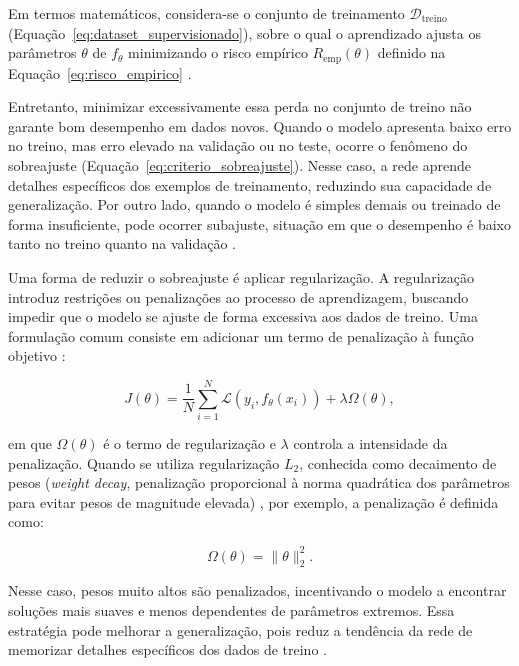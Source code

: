 \documentclass[
    12pt,
    openright,
    oneside,
    a4paper,
    english,
    brazil
]{abntex2}
\begin{document}
Em termos matemáticos, considera-se o conjunto de treinamento \(\mathcal{D}_{\text{treino}}\) (Equação~\eqref{eq:dataset_supervisionado}), sobre o qual o aprendizado ajusta os parâmetros \(\theta\) de \(f_{\theta}\) minimizando o risco empírico \(R_{\text{emp}}(\theta)\) definido na Equação~\eqref{eq:risco_empirico} \cite{deisenroth2020mathematics,goodfellow2016deep}.

Entretanto, minimizar excessivamente essa perda no conjunto de treino não garante bom desempenho em dados novos. Quando o modelo apresenta baixo erro no treino, mas erro elevado na validação ou no teste, ocorre o fenômeno do sobreajuste (Equação~\eqref{eq:criterio_sobreajuste}). Nesse caso, a rede aprende detalhes específicos dos exemplos de treinamento, reduzindo sua capacidade de generalização. Por outro lado, quando o modelo é simples demais ou treinado de forma insuficiente, pode ocorrer subajuste, situação em que o desempenho é baixo tanto no treino quanto na validação \cite{goodfellow2016deep,deisenroth2020mathematics}.

Uma forma de reduzir o sobreajuste é aplicar regularização. A regularização introduz restrições ou penalizações ao processo de aprendizagem, buscando impedir que o modelo se ajuste de forma excessiva aos dados de treino. Uma formulação comum consiste em adicionar um termo de penalização à função objetivo \cite{goodfellow2016deep}:

\begin{equation}
\label{eq:funcao_objetivo_reg}
J(\theta) =
\frac{1}{N}
\sum_{i=1}^{N}
\mathcal{L}(y_i, f_{\theta}(x_i))
+
\lambda \Omega(\theta),
\end{equation}

em que \(\Omega(\theta)\) é o termo de regularização e \(\lambda\) controla a intensidade da penalização. Quando se utiliza regularização \(L_2\), conhecida como decaimento de pesos (\textit{weight decay}, penalização proporcional à norma quadrática dos parâmetros para evitar pesos de magnitude elevada) \cite{goodfellow2016deep}, por exemplo, a penalização é definida como:

\begin{equation}
\label{eq:penalizacao_l2}
\Omega(\theta) = \|\theta\|_2^2.
\end{equation}

Nesse caso, pesos muito altos são penalizados, incentivando o modelo a encontrar soluções mais suaves e menos dependentes de parâmetros extremos. Essa estratégia pode melhorar a generalização, pois reduz a tendência da rede de memorizar detalhes específicos dos dados de treino \cite{goodfellow2016deep}.
\end{document}
